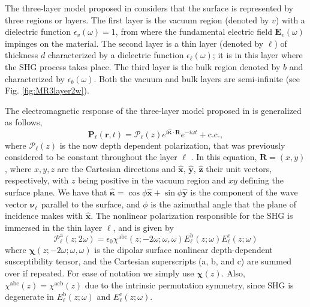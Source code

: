 \documentclass[utf8]{frontiersSCNS}
\begin{document}
The three-layer model proposed in \cite{andersonPRB16b} considers that the
surface is represented by three regions or layers. The first layer is the vacuum
region (denoted by $v$) with a dielectric function $\epsilon_{v}(\omega) = 1$,
from where the fundamental electric field $\mathbf{E}_{v}(\omega)$ impinges on
the material. The second layer is a thin layer (denoted by $\ell$) of thickness
$d$ characterized by a dielectric function $\epsilon_{\ell}(\omega)$; it is in
this layer where the SHG process takes place. The third layer is the bulk region
denoted by $b$ and characterized by $\epsilon_{b}(\omega)$. Both the vacuum and
bulk layers are semi-infinite (see Fig. \ref{fig:MR3layer2w}).

The electromagnetic response of the three-layer model proposed in
\cite{andersonPRB16b} is generalized as follows,
\begin{equation}\label{eq:psheet}
\mathbf{P}_{\ell}(\mathbf{r},t) = \boldsymbol{\mathcal{P}}_{\ell}(z)
e^{i\hat{\boldsymbol{\kappa}}\cdot
\mathbf{R}}e^{-i\omega t}
+ \mathrm{c.c.},
\end{equation}
where $\boldsymbol{\mathcal{P}_{\ell}}(z)$ is the now depth dependent
polarization, that was previously considered to be constant throughout the layer
$\ell$ \citep{andersonPRB16b}. In this equation, $\mathbf{R}=(x,y)$, where
$x,y,z$ are the Cartesian directions and $\mathbf{\hat{x}}$, $\mathbf{\hat{y}}$,
$\mathbf{\hat{z}}$ their unit vectors, respectively, with $z$ being positive in
the vacuum region and $xy$ defining the surface plane. We have that
$\hat{\boldsymbol{\kappa}}=\cos\phi\mathbf{\hat{x}}+\sin\phi\mathbf{\hat{y}}$ is
the component of the wave vector $\boldsymbol{\nu}^{\phantom{a}}_{\ell}$
parallel to the surface, and $\phi$ is the azimuthal angle that the plane of
incidence makes with $\mathbf{\hat{x}}$. The nonlinear polarization responsible
for the SHG is immersed in the thin layer $\ell$, and is given by
\begin{equation}\label{eq:tres}
\mathcal{P}^{\mathrm{a}}_{\ell}(z;2\omega)=
\epsilon_{0}\chi^{\mathrm{abc}}(z;-2\omega;\omega,\omega)
    E^{\mathrm{b}}_{\ell}(z;\omega)E^{\mathrm{c}}_{\ell}(z;\omega)
\end{equation}
where $\boldsymbol{\chi}(z;-2\omega;\omega,\omega)$ is the dipolar surface
nonlinear depth-dependent susceptibility tensor, and the Cartesian superscripts
(a, b, and c) are summed over if repeated. For ease of notation we simply use
$\boldsymbol{\chi}(z)$. Also, $\chi^{\mathrm{abc}}(z) = \chi^{\mathrm{acb}}(z)$
due to the intrinsic permutation symmetry, since SHG is degenerate in
$E^{\mathrm{b}}_{\ell}(z;\omega)$ and $E^{\mathrm{c}}_{\ell}(z;\omega)$.
\end{document}
